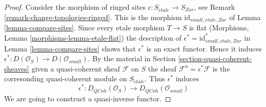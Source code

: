 \begin{proof}
Consider the morphism of ringed sites
$\epsilon : S_{\acute{e}tale} \to S_{Zar}$, see
Remark \ref{remark-change-topologies-ringed}.
This is the morphism $\text{id}_{small, \acute{e}tale, Zar}$ of
Lemma \ref{lemma-compare-sites}.
Since every etale morphism $T \to S$ is flat
(Morphisms, Lemma \ref{morphisms-lemma-etale-flat})
the description of $\epsilon^* = \text{id}_{small, \acute{e}tale, Zar}^*$ in
Lemma \ref{lemma-compare-sites}
shows that $\epsilon^*$ is an exact functor. Hence it induces
$\epsilon^* : D(\mathcal{O}_S) \to D(\mathcal{O}_{small})$.
By the material in
Section \ref{section-quasi-coherent-sheaves}
given a quasi-coherent sheaf $\mathcal{F}$ on $S$ the sheaf
$\mathcal{F}^a = \epsilon^*\mathcal{F}$ is the corresonding quasi-coherent
module on $S_{\acute{e}tale}$. Thus $\epsilon^*$ induces
$$
\epsilon^* : D_{QCoh}(\mathcal{O}_S) \to D_{QCoh}(\mathcal{O}_{small})
$$
We are going to construct a quasi-inverse functor.


\end{proof}
